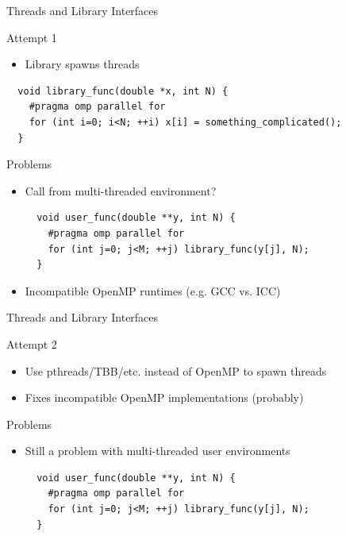 \begin{frame}[fragile]{Threads and Library Interfaces}

 \begin{block}{Attempt 1}
  \begin{itemize}
   \item Library spawns threads
  \end{itemize}
 \end{block}

   \begin{lstlisting}
  void library_func(double *x, int N) {
    #pragma omp parallel for
    for (int i=0; i<N; ++i) x[i] = something_complicated();
  }
  \end{lstlisting}

  
  \begin{block}{Problems}
   \begin{itemize}
    \item Call from multi-threaded environment?
   \begin{lstlisting}
  void user_func(double **y, int N) {
    #pragma omp parallel for
    for (int j=0; j<M; ++j) library_func(y[j], N);
  }
  \end{lstlisting}
    \item Incompatible OpenMP runtimes (e.g. GCC vs. ICC)
   \end{itemize}
 \end{block}

\end{frame}

\begin{frame}[fragile]{Threads and Library Interfaces}

 \begin{block}{Attempt 2}
  \begin{itemize}
   \item Use pthreads/TBB/etc. instead of OpenMP to spawn threads
   \item Fixes incompatible OpenMP implementations (probably)
  \end{itemize}
 \end{block}

  \begin{block}{Problems}
   \begin{itemize}
    \item Still a problem with multi-threaded user environments
   \begin{lstlisting}
  void user_func(double **y, int N) {
    #pragma omp parallel for
    for (int j=0; j<M; ++j) library_func(y[j], N);
  }
   \end{lstlisting}
  \end{itemize}
 \end{block}

\end{frame}


